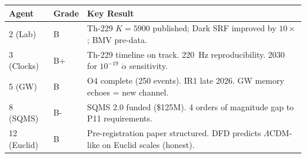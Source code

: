 \documentclass[11pt,a4paper]{article}
\begin{document}
\begin{center}
\begin{tabular}{llp{8cm}}
\toprule
\textbf{Agent} & \textbf{Grade} & \textbf{Key Result} \\
\midrule
2 (Lab) & B & Th-229 $K = 5900$ published; Dark SRF improved by $10\times$; BMV pre-data. \\
3 (Clocks) & B+ & Th-229 timeline on track. 220~Hz reproducibility. 2030 for $10^{-19}$ $\dot\alpha$ sensitivity. \\
5 (GW) & B & O4 complete (250 events). IR1 late 2026. GW memory echoes = new channel. \\
8 (SQMS) & B- & SQMS 2.0 funded (\$125M). 4 orders of magnitude gap to P11 requirements. \\
12 (Euclid) & B & Pre-registration paper structured. DFD predicts $\Lambda$CDM-like on Euclid scales (honest). \\
\bottomrule
\end{tabular}
\end{center}
\end{document}
